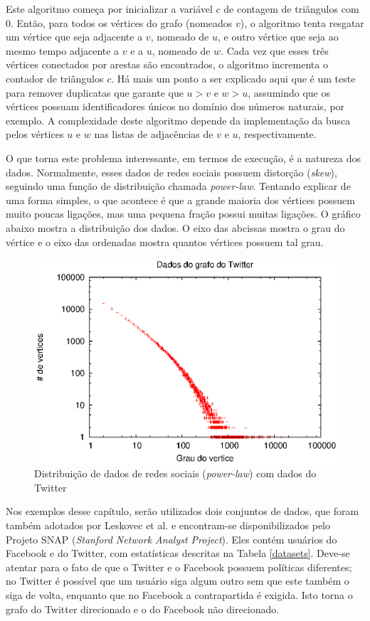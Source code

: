 Este algoritmo começa por inicializar a variável $c$ de contagem de triângulos com $0$. Então, para
todos os vértices do grafo (nomeados $v$), o algoritmo tenta resgatar um vértice que seja adjacente a 
$v$, nomeado de $u$, e outro vértice que seja ao mesmo tempo adjacente a $v$ e a $u$, nomeado de $w$.
Cada vez que esses três vértices conectados por arestas são encontrados, o algoritmo incrementa o 
contador de triângulos $c$. Há mais um ponto a ser explicado aqui que é um teste para remover duplicatas
que garante que $u>v$ e $w>u$, assumindo que os vértices possuam identificadores únicos no domínio dos
números naturais, por exemplo. A complexidade deste algoritmo depende da implementação da busca pelos 
vértices $u$ e $w$ nas listas de adjacências de $v$ e $u$, respectivamente.

O que torna este problema interessante, em termos de execução, é a natureza dos dados. Normalmente, esses
dados de redes sociais possuem distorção (\emph{skew}), seguindo uma função de distribuição chamada 
\emph{power-law}. Tentando explicar de uma forma simples, o que acontece é que a grande maioria dos 
vértices possuem muito poucas ligações, mas uma pequena fração possui muitas ligações. O gráfico abaixo 
mostra a distribuição dos dados. O eixo das abcissas mostra o grau do vértice e o eixo das ordenadas 
mostra quantos vértices possuem tal grau.

\begin{figure}[!htbp]
	\centerline{\includegraphics[width=0.7\linewidth]{power_law.eps}}
	\caption{Distribuição de dados de redes sociais (\emph{power-law}) com dados do Twitter}
	\label{fig:powerlaw}
\end{figure}

Nos exemplos desse capítulo, serão utilizados dois conjuntos
de dados, que foram também adotados por Leskovec et al. \citep{leskovec2012learning} e encontram-se 
disponibilizados pelo Projeto SNAP (\textit{Stanford Network Analyst Project}). Eles contém
usuários do Facebook e do Twitter, com estatísticas descritas na Tabela \ref{datasets}.
Deve-se atentar para o fato de que o Twitter e o Facebook possuem políticas diferentes; no Twitter
é possível que um usuário siga algum outro sem que este também o siga de volta, enquanto que
no Facebook a contrapartida é exigida. Isto torna o grafo do Twitter direcionado e o do Facebook
não direcionado. 

